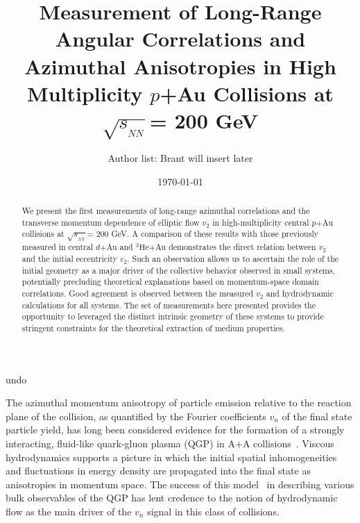 \documentclass[%
reprint,
showpacs,preprintnumbers,
 amsmath,amssymb,
 aps,
]{revtex4-1}
\newcommand{\sqsn}{\mbox{$\sqrt{s_{_{NN}}}$}\xspace}
\newcommand{\dau}{\mbox{$d$+Au}\xspace}
\newcommand{\pau}{\mbox{$p$+Au}\xspace}
\newcommand{\hau}{\mbox{$^3\text{He}$+Au}\xspace}
\begin{document}
\title{Measurement of Long-Range Angular Correlations and Azimuthal Anisotropies in High Multiplicity \pau Collisions at \sqsn = 200 GeV}%

\author{Author list: Brant will insert later}
undo
\date{\today}%

\begin{abstract}
We present the first measurements of long-range azimuthal correlations and the transverse momentum dependence of elliptic flow $v_2$ in high-multiplicity central \pau collisions at \sqsn = 200 GeV. A comparison of these results with those previously measured in central \dau and \hau demonstrates the direct relation between $v_2$ and the initial eccentricity $\varepsilon_2$. Such an observation allows us to ascertain the role of the initial geometry as a major driver of the collective behavior observed in small systems, potentially precluding theoretical explanations based on momentum-space domain correlations. Good agreement is observed between the measured $v_2$ and hydrodynamic calculations for all systems. The set of measurements here presented provides the opportunity to leveraged the distinct intrinsic geometry of these systems to provide stringent constraints for the theoretical extraction of medium properties. 
\end{abstract}

\maketitle

The azimuthal momentum anisotropy of particle emission relative to the reaction plane of the collision, as quantified by the Fourier coefficients $v_n$ of the final state particle yield, has long been considered evidence for the formation of a strongly interacting, fluid-like quark-gluon plasma (QGP) in A+A collisions~\cite{Snellings:2011sz}. Viscous hydrodynamics supports a picture in which the initial spatial inhomogeneities and fluctuations in energy density are propagated into the final state as anisotropies in momentum space.  The success of this model~\cite{Luzum:2008cw} in describing various bulk observables of the QGP has lent credence to the notion of hydrodynamic flow as the main driver of the $v_{n}$ signal in this class of collisions.
\end{document}
